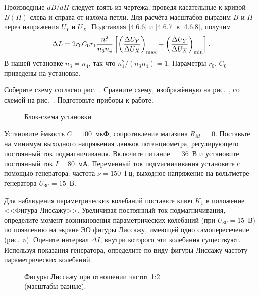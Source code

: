 Производные $dB/dH$ следует взять из чертежа, проведя касательные к кривой
$B(H)$ слева и справа от излома петли. Для расчёта масштабов выразим $B$ и $H$
через напряжения $U_Y$ и $U_X$. Подставляя \eqref{4.6.6} и \eqref{4.6.7} в
\eqref{4.6.8}, получим
\begin{equation}
	\eqmark{4.6.9}
	\Delta L = 2r_0C_0r_1\frac{n^2_1}{n_3n_4}\left[\left(\frac{\Delta
U_Y}{\Delta U_X}\right)_{\rm max} - \left(\frac{\Delta U_Y}{\Delta
U_X}\right)_{\rm min}\right].
\end{equation}
В нашей установке $n_3 = n_4$, так что $n_1^2/ (n_3n_4) = 1$. Параметры $r_0$,
$C_0$ приведены на установке.

\begin{lab:task}


\item
Соберите схему согласно рис.~. Сравните схему, изображённую
на рис.~, со схемой на рис.~. Подготовьте приборы к работе.
\begin{figure}[h!]
\centering
	\caption{Блок-схема установки}
\end{figure}

\item
Установите ёмкость $C = 100$~мкФ, сопротивление магазина $R_M =~0.$ Поставьте на
минимум выходного напряжения движок потенциометра, регулирующего постоянный ток
подмагничивания. Включите питание $= 36$~В и установите постоянный ток $I
=80$~мА. Переменный ток подмагничивания установите с помощью генератора: частота
$\nu = 150$~Гц; выходное напряжение на вольтметре генератора $U_\text{ЗГ} =
15$~В.

\item
Для наблюдения параметрических колебаний поставьте ключ $K_1$ в положение
<<Фигура Лиссажу>>. Увеличивая постоянный ток подмагничивания, определите момент
возникновения параметрических колебаний (при $U_\text{ЗГ} = 15$~В) по появлению
на экране ЭО фигуры Лиссажу, имеющей одно самопересечение (рис.~a). Оцените интервал $\Delta I$, внутри которого эти колебания
существуют. Используя показания генератора, определите по виду фигуры Лиссажу
частоту параметрических колебаний.
\begin{figure}[h!]
\centering
	\caption{Фигуры Лиссажу при отношении частот 1:2 \\(масштабы разные).}
\end{figure}


\end{lab:task}

